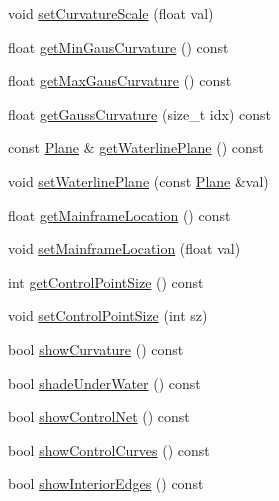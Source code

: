 \begin{DoxyCompactItemize}
void \hyperlink{classShipCAD_1_1SubdivisionSurface_af0de3c1d862ddb2466effbcff0189845}{set\+Curvature\+Scale} (float val)
\item 
float \hyperlink{classShipCAD_1_1SubdivisionSurface_a485f26282ac985446cdec3a98753c2eb}{get\+Min\+Gaus\+Curvature} () const 
\item 
float \hyperlink{classShipCAD_1_1SubdivisionSurface_a61fb5c6ccba4c5491ddcc69182213831}{get\+Max\+Gaus\+Curvature} () const 
\item 
float \hyperlink{classShipCAD_1_1SubdivisionSurface_a4e1259732cf153c79e9323063bb21f0e}{get\+Gauss\+Curvature} (size\+\_\+t idx) const 
\item 
const \hyperlink{classShipCAD_1_1Plane}{Plane} \& \hyperlink{classShipCAD_1_1SubdivisionSurface_a30754b2315cbf3dd6d551bf395da91ac}{get\+Waterline\+Plane} () const 
\item 
void \hyperlink{classShipCAD_1_1SubdivisionSurface_ae063d1a2be4e227aaefb8a3578d3f52f}{set\+Waterline\+Plane} (const \hyperlink{classShipCAD_1_1Plane}{Plane} \&val)
\item 
float \hyperlink{classShipCAD_1_1SubdivisionSurface_a5cd4b62dd61e279f77dc39fd3798c46d}{get\+Mainframe\+Location} () const 
\item 
void \hyperlink{classShipCAD_1_1SubdivisionSurface_a81d5637d3b405da5975eb8e86d058bcd}{set\+Mainframe\+Location} (float val)
\item 
int \hyperlink{classShipCAD_1_1SubdivisionSurface_a374e11515db37931bbe38d097893967a}{get\+Control\+Point\+Size} () const 
\item 
void \hyperlink{classShipCAD_1_1SubdivisionSurface_ac719f8921c733e45c091b2ca0ce12237}{set\+Control\+Point\+Size} (int sz)
\item 
bool \hyperlink{classShipCAD_1_1SubdivisionSurface_af92d925b07686d3dfb93e8696f264e09}{show\+Curvature} () const 
\item 
bool \hyperlink{classShipCAD_1_1SubdivisionSurface_ac59e73ec163b7daacad94fe2d73b5776}{shade\+Under\+Water} () const 
\item 
bool \hyperlink{classShipCAD_1_1SubdivisionSurface_a34a553e1f50b7eb97a5380c817f0efb6}{show\+Control\+Net} () const 
\item 
bool \hyperlink{classShipCAD_1_1SubdivisionSurface_afbad6f61c156d26464dbdc7a22d4d607}{show\+Control\+Curves} () const 
\item 
bool \hyperlink{classShipCAD_1_1SubdivisionSurface_a4cfec985803a6cc41b3afecb2e81ede5}{show\+Interior\+Edges} () const 
\item 

\end{DoxyCompactItemize}
